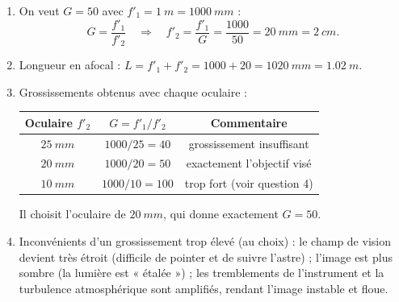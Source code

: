 \documentclass[11pt]{article}
\begin{document}
\begin{corrige}
\begin{enumerate}
\item On veut $G = 50$ avec $f'_1 = \SI{1}{m} = \SI{1000}{mm}$ :
\[ G = \dfrac{f'_1}{f'_2} \quad \Longrightarrow \quad f'_2 = \dfrac{f'_1}{G} = \dfrac{1000}{50} = \SI{20}{mm} = \SI{2}{cm}. \]
\item Longueur en afocal : $L = f'_1 + f'_2 = 1000 + 20 = \SI{1020}{mm} = \SI{1,02}{m}$.
\item Grossissements obtenus avec chaque oculaire :
\begin{center}
\begin{tabular}{|c|c|c|}
\hline
\rowcolor{popblueL} Oculaire $f'_2$ & $G = f'_1/f'_2$ & Commentaire \\
\hline
$\SI{25}{mm}$ & $1000/25 = 40$ & grossissement insuffisant \\
\hline
$\SI{20}{mm}$ & $1000/20 = 50$ & exactement l'objectif visé \\
\hline
$\SI{10}{mm}$ & $1000/10 = 100$ & trop fort (voir question 4) \\
\hline
\end{tabular}
\end{center}
Il choisit l'oculaire de $\SI{20}{mm}$, qui donne exactement $G = 50$.
\item Inconvénients d'un grossissement trop élevé (au choix) : le champ de vision devient très étroit (difficile de pointer et de suivre l'astre) ; l'image est plus sombre (la lumière est « étalée ») ; les tremblements de l'instrument et la turbulence atmosphérique sont amplifiés, rendant l'image instable et floue.
\end{enumerate}
\end{corrige}
\end{document}

